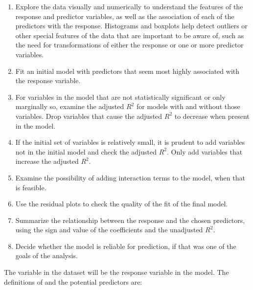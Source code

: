 \begin{enumerate}
	
  \item Explore the data visually and numerically to understand the features of the response and predictor variables, as well as the association of each of the predictors with the response.  Histograms and boxplots help detect outliers or other special features of the data that are important to be aware of, such as the need for transformations of either the response or one or more predictor variables. 
  
  \item Fit an initial model with predictors that seem most highly associated with the response variable.
  
  \item For variables in the model that are not statistically significant or only marginally so, examine the adjusted $R^2$ for models with and without those variables. Drop variables that cause the adjusted $R^2$ to decrease when present in the model.
  
  \item If the initial set of variables is relatively small, it is prudent to add variables not in the initial model and check the adjusted $R^2$.  Only add variables that increase the adjusted $R^2$.

  \item Examine the possibility of adding interaction terms to the model, when that is feasible. 
  
  \item Use the residual plots to check the quality of the fit of the final model.

  \item Summarize the relationship between the response and the chosen predictors, using the sign and value of the coefficients and the unadjusted $R^2$.

  \item Decide whether the model is reliable for prediction, if that was one of the goals of the analysis.

\end{enumerate}

The variable  in the dataset  will be the response variable in the model.  The definitions of  and the potential predictors are: 

